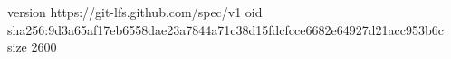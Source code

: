 version https://git-lfs.github.com/spec/v1
oid sha256:9d3a65af17eb6558dae23a7844a71c38d15fdcfcce6682e64927d21acc953b6c
size 2600

